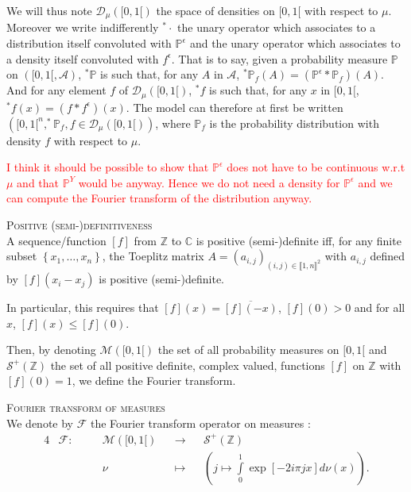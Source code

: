 We will thus note $\mathcal{D}_{\mu}([0,1[)$ the space of densities on $[0, 1[$ with respect to $\mu$.
Moreover we write indifferently $^{*}\cdot$ the unary operator which associates to a distribution itself convoluted with $\mathds{P}^{\epsilon}$ and the unary operator which associates to a density itself convoluted with $f^{\epsilon}$.
That is to say, given a probability measure $\mathds{P}$ on $\left([0, 1[, \mathcal{A}\right)$, $^{*}\mathds{P}$ is such that, for any $A$ in $\mathcal{A}$, $^{*}\mathds{P}_{f}(A) = (\mathds{P}^{\epsilon}*\mathds{P}_{f})(A)$.
And for any element $f$ of $\mathcal{D}_{\mu}([0, 1[)$, $^{*}f$ is such that, for any $x$ in $[0, 1[$, $^{*}f(x) = (f * f^{\epsilon})(x)$.
The model can therefore at first be written $\left([0,1[^{n}, ^{*}\mathds{P}_{f}, f\in\mathcal{D}_{\mu}([0,1[) \right)$, where $\mathds{P}_{f}$ is the probability distribution with density $f$ with respect to $\mu$.

\textcolor{red}{I think it should be possible to show that $\mathds{P}^{\epsilon}$ does not have to be continuous w.r.t $\mu$ and that $\mathds{P}^{Y}$ would be anyway. Hence we do not need a density for $\mathds{P}^{\epsilon}$ and we can compute the Fourier transform of the distribution anyway.}

\medskip

\begin{rem}{\textsc{Positive (semi-)definitiveness}\\}\label{rem1.4.1}
A sequence/function $[f]$ from $\mathds{Z}$ to $\mathds{C}$ is positive (semi-)definite iff, for any finite subset $\left\{x_{1}, \hdots, x_{n}\right\}$, the Toeplitz matrix $A=(a_{i,j})_{(i,j) \in \llbracket 1, n \rrbracket^{2}}$ with $a_{i,j}$ defined by $[f](x_{i} - x_{j})$ is positive (semi-)definite.

In particular, this requires that $[f](x) = \overline{[f](-x)}$, $[f](0) > 0$ and for all $x$, $[f](x) \leq [f](0).$
\end{rem}

\medskip

Then, by denoting $\mathcal{M}([0, 1[)$ the set of all probability measures on $[0,1[$ and $\mathcal{S}^{+}(\mathds{Z})$ the set of all positive definite, complex valued, functions $[f]$ on $\mathds{Z}$ with $[f](0)=1$, we define the Fourier transform.

\begin{de}{\textsc{Fourier transform of measures}\\}\label{de1.4.2}
We denote by $\mathcal{F}$ the Fourier transform operator on measures :
\begin{alignat*}{4}
&\mathcal{F} : \quad && \mathcal{M}([0, 1[) &&\rightarrow&& \mathcal{S}^{+}(\mathds{Z})\\
& && \nu && \mapsto && \left(j \mapsto \int\limits_{0}^{1} \exp\left[- 2 i \pi j x\right] d\nu(x)\right).
\end{alignat*}
\end{de}

